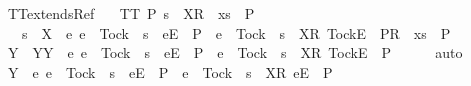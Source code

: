 \begin{isabellebody}
%
\endisadelimproof
\isanewline
{}\isamarkupfalse%
\ TT{}{\isacharunderscore}extends{\isacharunderscore}Ref{\isacharcolon}\isanewline
\ \ \ {\isachardoublequoteopen}TT{}\ P{\isachardoublequoteclose}\ {\isachardoublequoteopen}s\ {\isacharat}\ {\isacharbrackleft}{\isacharbrackleft}X{\isacharbrackright}\isactrlsub R{\isacharbrackright}\ {\isacharat}\ xs\ {\isasymin}\ P{\isachardoublequoteclose}\isanewline
\ \ \ {\isachardoublequoteopen}s\ {\isacharat}\ {\isacharbrackleft}{\isacharbrackleft}X\ {\isasymunion}\ {\isacharbraceleft}e{\isachardot}\ e\ {\isasymnoteq}\ Tock\ {\isasymand}\ s\ {\isacharat}\ {\isacharbrackleft}{\isacharbrackleft}e{\isacharbrackright}\isactrlsub E{\isacharbrackright}\ {\isasymnotin}\ P\ {\isasymor}\ e\ {\isacharequal}\ Tock\ {\isasymand}\ s\ {\isacharat}\ {\isacharbrackleft}{\isacharbrackleft}X{\isacharbrackright}\isactrlsub R{\isacharcomma}\ {\isacharbrackleft}Tock{\isacharbrackright}\isactrlsub E{\isacharbrackright}\ {\isasymnotin}\ P{\isacharbraceright}{\isacharbrackright}\isactrlsub R{\isacharbrackright}\ {\isacharat}\ xs\ {\isasymin}\ P{\isachardoublequoteclose}\isanewline
%
\isadelimproof
%
\endisadelimproof
%
\isatagproof
{}\isamarkupfalse%
\ {\isacharminus}\isanewline
\ \ \isamarkupfalse%
\ Y\ \ Y{\isacharcolon}{\isachardoublequoteopen}Y\ {\isacharequal}\ {\isacharbraceleft}e{\isachardot}\ e\ {\isasymnoteq}\ Tock\ {\isasymand}\ s\ {\isacharat}\ {\isacharbrackleft}{\isacharbrackleft}e{\isacharbrackright}\isactrlsub E{\isacharbrackright}\ {\isasymnotin}\ P\ {\isasymor}\ e\ {\isacharequal}\ Tock\ {\isasymand}\ s\ {\isacharat}\ {\isacharbrackleft}{\isacharbrackleft}X{\isacharbrackright}\isactrlsub R{\isacharcomma}\ {\isacharbrackleft}Tock{\isacharbrackright}\isactrlsub E{\isacharbrackright}\ {\isasymnotin}\ P{\isacharbraceright}{\isachardoublequoteclose}\isanewline
\ \ \ \ \isamarkupfalse%
\ auto\isanewline
\ \ \isamarkupfalse%
\ \isamarkupfalse%
\ {\isachardoublequoteopen}Y\ {\isasyminter}\ {\isacharbraceleft}e{\isachardot}\ {\isacharparenleft}e\ {\isasymnoteq}\ Tock\ {\isasymand}\ s\ {\isacharat}\ {\isacharbrackleft}{\isacharbrackleft}e{\isacharbrackright}\isactrlsub E{\isacharbrackright}\ {\isasymin}\ P{\isacharparenright}\ {\isasymor}\ {\isacharparenleft}e\ {\isacharequal}\ Tock\ {\isasymand}\ s\ {\isacharat}\ {\isacharbrackleft}{\isacharbrackleft}X{\isacharbrackright}\isactrlsub R{\isacharcomma}\ {\isacharbrackleft}e{\isacharbrackright}\isactrlsub E{\isacharbrackright}\ {\isasymin}\ P{\isacharparenright}\ {\isacharbraceright}\ {\isacharequal}\ {\isacharbraceleft}{\isacharbraceright}{\isachardoublequoteclose}\isanewline

\end{isabellebody}
